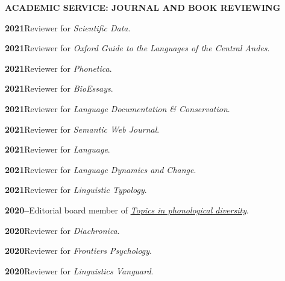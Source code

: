 \documentclass[11pt]{article}
\newcommand{\hangpara}{
 \setlength{\parindent}{0in} %
 \hangindent=0.42in %
}
\begin{document}
\vskip 20pt
\begin{flushleft}
{\bf ACADEMIC SERVICE: JOURNAL AND BOOK REVIEWING}
\end{flushleft}

\hangpara
{\bf 2021}\hspace{1ex}Reviewer for \textit{Scientific Data}.

\vskip 6pt
\hangpara
{\bf 2021}\hspace{1ex}Reviewer for \textit{Oxford Guide to the Languages of the Central Andes}.

\vskip 6pt
\hangpara
{\bf 2021}\hspace{1ex}Reviewer for \textit{Phonetica}.

\vskip 6pt
\hangpara
{\bf 2021}\hspace{1ex}Reviewer for \textit{BioEssays}.

\vskip 6pt
\hangpara
{\bf 2021}\hspace{1ex}Reviewer for \textit{Language Documentation \& Conservation}.

\vskip 6pt
\hangpara
{\bf 2021}\hspace{1ex}Reviewer for \textit{Semantic Web Journal}.

\hangpara
\vskip 6pt
{\bf 2021}\hspace{1ex}Reviewer for \textit{Language}.

\vskip 6pt
\hangpara
{\bf 2021}\hspace{1ex}Reviewer for \textit{Language Dynamics and Change}.

\vskip 6pt
\hangpara
{\bf 2021}\hspace{1ex}Reviewer for \textit{Linguistic Typology}.

\vskip 6pt
\hangpara
{\bf 2020--}\hspace{1ex}Editorial board member of \textit{\href{https://langsci-press.org/catalog/series/tpd}{Topics in phonological diversity}}.

\vskip 6pt
\hangpara
{\bf 2020}\hspace{1ex}Reviewer for \textit{Diachronica}.

\vskip 6pt
\hangpara
{\bf 2020}\hspace{1ex}Reviewer for \textit{Frontiers Psychology}.

\vskip 6pt
\hangpara
{\bf 2020}\hspace{1ex}Reviewer for \textit{Linguistics Vanguard}.
\end{document}

